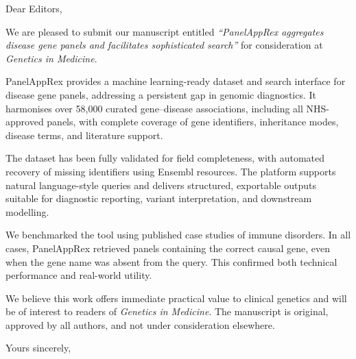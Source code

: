 \documentclass[12pt,a4paper]{letter}
\begin{document}
 
\begin{letter}{Dear Editors,}

\opening{}

We are pleased to submit our manuscript entitled \textit{``PanelAppRex aggregates disease gene panels and facilitates sophisticated search''} for consideration at \textit{Genetics in Medicine}.

PanelAppRex provides a machine learning-ready dataset and search interface for disease gene panels, addressing a persistent gap in genomic diagnostics. It harmonises over 58,000 curated gene–disease associations, including all NHS-approved panels, with complete coverage of gene identifiers, inheritance modes, disease terms, and literature support.

The dataset has been fully validated for field completeness, with automated recovery of missing identifiers using Ensembl resources. The platform supports natural language-style queries and delivers structured, exportable outputs suitable for diagnostic reporting, variant interpretation, and downstream modelling.

We benchmarked the tool using published case studies of immune disorders. In all cases, PanelAppRex retrieved panels containing the correct causal gene, even when the gene name was absent from the query. This confirmed both technical performance and real-world utility.

We believe this work offers immediate practical value to clinical genetics and will be of interest to readers of \textit{Genetics in Medicine}. The manuscript is original, approved by all authors, and not under consideration elsewhere.

\closing{Yours sincerely,}

\end{letter}
\end{document}
